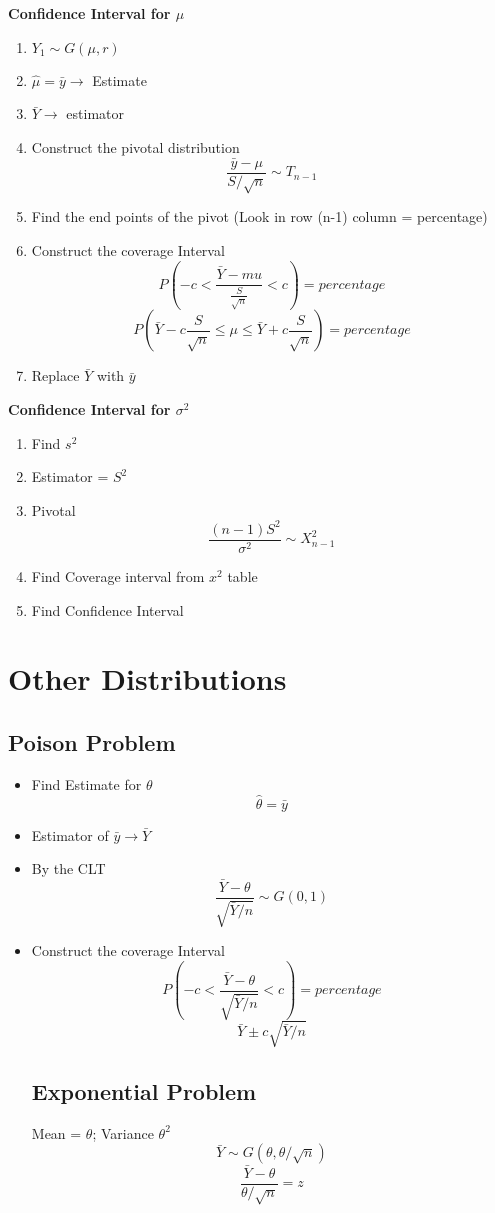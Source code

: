 \documentclass{article}
\begin{document}
\textbf{Confidence Interval for \(\mu\)}
\begin{enumerate}
\item \(Y_1 \sim G(\mu, r)\)
\item \(\hat{\mu} = \bar{y} \rightarrow \) Estimate 
\item \(\bar{Y} \rightarrow\) estimator
\item Construct the pivotal distribution 
$$ \frac{\bar{y} - \mu }{S / \sqrt{n}} \sim T_{n-1}$$
\item Find the end points of the pivot (Look in row (n-1) column = percentage)
\item Construct the coverage Interval
$$ P( -c < \frac{\bar{Y} - mu}{\frac{S}{\sqrt{n}}} < c ) = percentage $$
$$ P( \bar{Y} - c \frac{S}{\sqrt{n}} \leq \mu \leq \bar{Y} + c \frac{S}{\sqrt{n}}) = percentage$$
\item Replace \(\bar{Y}\) with \(\bar{y}\)
\end{enumerate}
\textbf{Confidence Interval for \(\sigma^2\) }
\begin{enumerate}
\item Find \(s^2\)
\item Estimator = \(S^2\) 
\item Pivotal 
$$\frac{(n-1)S^2}{\sigma^2} \sim X^2_{n-1}$$
\item Find Coverage interval from \(x^2\) table 
\item Find Confidence Interval  
\end{enumerate}

\section{Other Distributions}
\subsection*{Poison Problem}
\begin{itemize}
\item Find Estimate for \(\theta\)
\[\hat{\theta} = \bar{y}\]
\item Estimator of \(\bar{y} \rightarrow \bar{Y}\)
\item By the CLT 
\[\frac{\bar{Y} - \theta}{\sqrt{\bar{Y} / n}} \sim G(0,1) \]
\item Construct the coverage Interval
$$ P( -c < \frac{\bar{Y} - \theta}{\sqrt{\bar{Y} / n}} < c ) = percentage $$
$$  \bar{Y} \pm c \sqrt{\bar{Y} / n} $$
\subsection*{Exponential Problem}
Mean = \(\theta\); Variance \(\theta^2\) 
$$ \bar{Y} \sim G(\theta , \theta/ \sqrt{n}) $$
$$ \frac{\bar{Y} - \theta}{\theta / \sqrt{n}} = z $$
\end{itemize}
\end{document}
